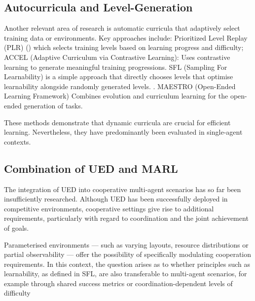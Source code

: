 \subsection*{Autocurricula and Level-Generation}

Another relevant area of research is automatic curricula that adaptively select training data or environments.
Key approaches include: Prioritized Level Replay (PLR) (\cite{JiangPLR2021}) which selects training levels based on learning progress and difficulty; ACCEL (Adaptive Curriculum via Contrastive Learning): Uses contrastive learning to generate meaningful training progressions. SFL (Sampling For Learnability) is a simple approach that directly chooses levels that optimise learnability alongside randomly generated levels. \cite{rutherford2024sfl}. MAESTRO (Open-Ended Learning Framework) \cite{samvelyan2023maestr}Combines evolution and curriculum learning for the open-ended generation of tasks.

These methods demonstrate that dynamic curricula are crucial for efficient learning. Nevertheless, they have predominantly been evaluated in single-agent contexts.

\subsection*{Combination of UED and MARL}

The integration of UED into cooperative multi-agent scenarios has so far been insufficiently researched. Although UED has been successfully deployed in competitive environments, cooperative settings give rise to additional requirements, particularly with regard to coordination and the joint achievement of goals.

Parameterised environments — such as varying layouts, resource distributions or partial observability — offer the possibility of specifically modulating cooperation requirements. In this context, the question arises as to whether principles such as learnability, as defined in SFL, are also transferable to multi-agent scenarios, for example through shared success metrics or coordination-dependent levels of difficulty






